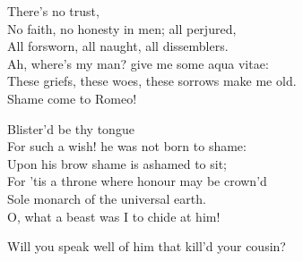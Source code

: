 \begin{speech}
There's no trust, \\
No faith, no honesty in men; all perjured, \\
All forsworn, all naught, all dissemblers. \\
Ah, where's my man? give me some aqua vitae: \\
These griefs, these woes, these sorrows make me old. \\
Shame come to Romeo! \\
\end{speech}
\begin{speech}
Blister'd be thy tongue \\
For such a wish! he was not born to shame: \\
Upon his brow shame is ashamed to sit; \\
For 'tis a throne where honour may be crown'd \\
Sole monarch of the universal earth. \\
O, what a beast was I to chide at him! \\
\end{speech}
\begin{speech}
Will you speak well of him that kill'd your cousin?
\\
\end{speech}
